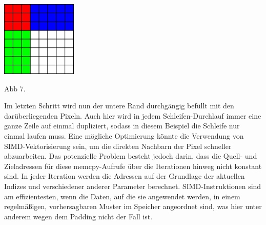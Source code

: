 \documentclass[course=erap]{aspdoc}
\begin{document}
\centering
\includegraphics[width=0.27\textwidth]{"2x2_6"}
\begin{center}
\vspace{-0.5em}
  Abb 7.
\vspace{-0.5em}  
\end{center}
\justify
Im letzten Schritt wird nun der untere Rand durchgängig befüllt mit den darüberliegenden Pixeln. Auch hier wird in jedem Schleifen-Durchlauf immer eine ganze Zeile auf einmal dupliziert, sodass in diesem Beispiel die Schleife nur einmal laufen muss.
Eine mögliche Optimierung könnte die Verwendung von SIMD-Vektorisierung sein, um die direkten Nachbarn der Pixel schneller abzuarbeiten. Das potenzielle Problem besteht jedoch darin, dass die Quell- und Zieladressen für diese memcpy-Aufrufe über die Iterationen hinweg nicht konstant sind. In jeder Iteration werden die Adressen auf der Grundlage der aktuellen Indizes und verschiedener anderer Parameter berechnet. SIMD-Instruktionen sind am effizientesten, wenn die Daten, auf die sie angewendet werden, in einem regelmäßigen, vorhersagbaren Muster im Speicher angeordnet sind, was hier unter anderem wegen dem Padding nicht der Fall ist.

\pagebreak
\end{document}
